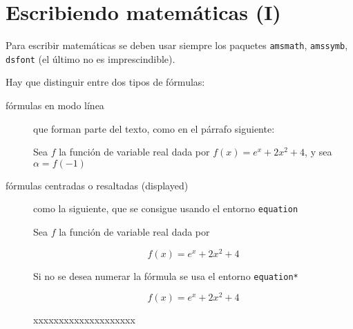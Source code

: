 \documentclass[10pt,a4paper]{report}
\begin{document}
\chapter{Escribiendo matemáticas (I)}





Para escribir matemáticas se deben usar siempre los paquetes
\texttt{amsmath}, \texttt{amssymb}, \texttt{dsfont} (el último no es imprescindible).

Hay que distinguir entre dos tipos de fórmulas:

\begin{description}
%
\item[fórmulas en modo línea] 
que forman parte del texto, como en el párrafo siguiente:




\bigskip
Sea $f$ la función de variable real dada por $f(x) = e^x + 2x^2 + 4$, y sea $\alpha = f(-1)$
\bigskip


%
\item[fórmulas centradas o resaltadas (displayed)]
como la siguiente, que se consigue usando el entorno \texttt{equation}




\bigskip
Sea $f$ la función de variable real dada por

\begin{equation}\label{eq1}
f(x) = e^x + 2x^2 + 4
\end{equation}

\bigskip





Si no se desea numerar la fórmula se usa el entorno \texttt{equation*}

\begin{equation*}
f(x) = e^x + 2x^2 + 4
\end{equation*}

\bigskip
xxxxxxxxxxxxxxxxxxxx
\bigskip



%
\end{description}
\end{document}
